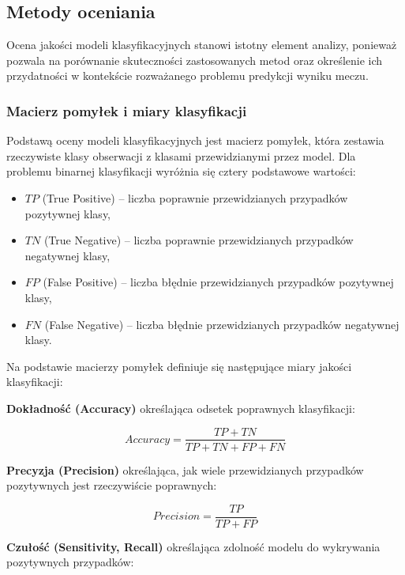 \documentclass[twoside]{customStyle}
\begin{document}
\subsection{Metody oceniania}

Ocena jakości modeli klasyfikacyjnych stanowi istotny element analizy, ponieważ pozwala na porównanie skuteczności zastosowanych metod oraz określenie ich przydatności w kontekście rozważanego problemu predykcji wyniku meczu. 

\subsubsection{Macierz pomyłek i miary klasyfikacji}

Podstawą oceny modeli klasyfikacyjnych jest macierz pomyłek, która zestawia rzeczywiste klasy obserwacji z klasami przewidzianymi przez model. Dla problemu binarnej klasyfikacji wyróżnia się cztery podstawowe wartości:

\begin{itemize}
    \item $TP$ (True Positive) -- liczba poprawnie przewidzianych przypadków pozytywnej klasy,
    \item $TN$ (True Negative) -- liczba poprawnie przewidzianych przypadków negatywnej klasy,
    \item $FP$ (False Positive) -- liczba błędnie przewidzianych przypadków pozytywnej klasy,
    \item $FN$ (False Negative) -- liczba błędnie przewidzianych przypadków negatywnej klasy.
\end{itemize}

Na podstawie macierzy pomyłek definiuje się następujące miary jakości klasyfikacji:

\textbf{Dokładność (Accuracy)} określająca odsetek poprawnych klasyfikacji:

\begin{equation}
Accuracy = \frac{TP + TN}{TP + TN + FP + FN}
\end{equation}

\textbf{Precyzja (Precision)} określająca, jak wiele przewidzianych przypadków pozytywnych jest rzeczywiście poprawnych:

\begin{equation}
Precision = \frac{TP}{TP + FP}
\end{equation}

\textbf{Czułość (Sensitivity, Recall)} określająca zdolność modelu do wykrywania pozytywnych przypadków:
\end{document}
